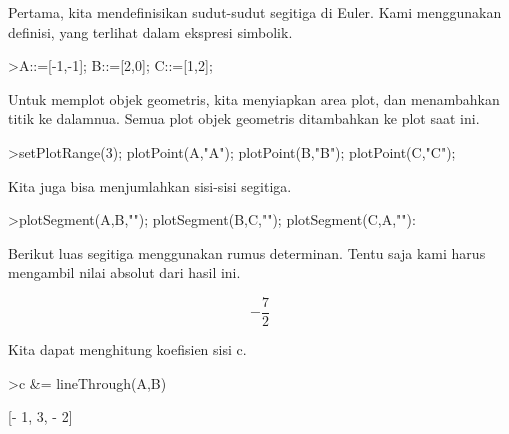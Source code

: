 \documentclass[12pt,arial,letterpaper]{book}
\begin{document}
\begin{eulercomment}
\begin{eulercomment}
\begin{eulercomment}
\begin{eulercomment}
\begin{eulercomment}
\begin{eulercomment}
\begin{eulercomment}
\begin{eulercomment}
\begin{eulercomment}
\begin{eulercomment}
\begin{eulercomment}
\begin{eulercomment}
\begin{eulercomment}
\begin{eulercomment}
\begin{eulercomment}
\begin{eulercomment}
\begin{eulercomment}
\begin{eulercomment}
\begin{eulercomment}
\begin{eulercomment}
\begin{eulercomment}
\begin{eulercomment}
\begin{eulercomment}
\begin{eulercomment}
\begin{eulercomment}
\begin{eulercomment}
\begin{eulercomment}
Pertama, kita mendefinisikan sudut-sudut segitiga di Euler. Kami
menggunakan definisi, yang terlihat dalam ekspresi simbolik.
\end{eulercomment}
\begin{eulerprompt}
>A::=[-1,-1]; B::=[2,0]; C::=[1,2];
\end{eulerprompt}
\begin{eulercomment}
Untuk memplot objek geometris, kita menyiapkan area plot, dan
menambahkan titik ke dalamnua.  Semua plot objek geometris ditambahkan
ke plot saat ini.
\end{eulercomment}
\begin{eulerprompt}
>setPlotRange(3); plotPoint(A,"A"); plotPoint(B,"B"); plotPoint(C,"C");
\end{eulerprompt}
\begin{eulercomment}
Kita juga bisa menjumlahkan sisi-sisi segitiga.
\end{eulercomment}
\begin{eulerprompt}
>plotSegment(A,B,""); plotSegment(B,C,""); plotSegment(C,A,""):
\end{eulerprompt}
\begin{eulercomment}
Berikut luas segitiga menggunakan rumus determinan.  Tentu saja kami
harus mengambil nilai absolut dari hasil ini.
\end{eulercomment}
\begin{eulerformula}
\[
-\frac{7}{2}
\]
\end{eulerformula}
\begin{eulercomment}
Kita dapat menghitung koefisien sisi c.
\end{eulercomment}
\begin{eulerprompt}
>c &= lineThrough(A,B)
\end{eulerprompt}
\begin{euleroutput}
  
                              [- 1, 3, - 2]
  

\end{euleroutput}
\end{eulercomment}
\end{eulercomment}
\end{eulercomment}
\end{eulercomment}
\end{eulercomment}
\end{eulercomment}
\end{eulercomment}
\end{eulercomment}
\end{eulercomment}
\end{eulercomment}
\end{eulercomment}
\end{eulercomment}
\end{eulercomment}
\end{eulercomment}
\end{eulercomment}
\end{eulercomment}
\end{eulercomment}
\end{eulercomment}
\end{eulercomment}
\end{eulercomment}
\end{eulercomment}
\end{eulercomment}
\end{eulercomment}
\end{eulercomment}
\end{eulercomment}
\end{eulercomment}
\end{document}
